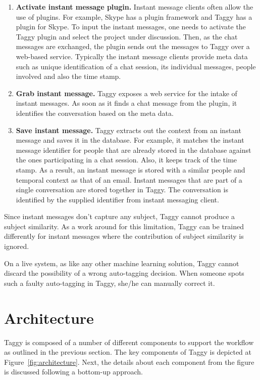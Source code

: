 \begin{enumerate}
	\item \textbf{Activate instant message plugin.} Instant message clients often allow the use of plugins. For example, Skype \cite{skype} has a plugin framework and Taggy has a plugin for Skype. To input the instant messages, one needs to activate the Taggy plugin and select the project under discussion. Then, as the chat messages are exchanged, the plugin sends out the messages to Taggy over a web-based service. Typically the instant message clients provide meta data such as unique identification of a chat session, its individual messages, people involved and also the time stamp.

	\item \textbf{Grab instant message.} Taggy exposes a web service for the intake of instant messages. As soon as it finds a chat message from the plugin, it identifies the conversation based on the meta data.
	
	\item \textbf{Save instant message.} Taggy extracts out the context from an instant message and saves it in the database. For example, it matches the instant message identifier for people that are already stored in the database against the ones participating in a chat session. Also, it keeps track of the time stamp. As a result, an instant message is stored with a similar people and temporal context as that of an email. Instant messages that are part of a single conversation are stored together in Taggy. The conversation is identified by the supplied identifier from instant messaging client.
\end{enumerate}

Since instant messages don't capture any subject, Taggy cannot produce a subject similarity. As a work around for this limitation, Taggy can be trained differently for instant messages where the contribution of subject similarity is ignored.

On a live system, as like any other machine learning solution, Taggy cannot discard the possibility of a wrong auto-tagging decision. When someone spots such a faulty auto-tagging in Taggy, she/he can manually correct it.

\section{Architecture}
Taggy is composed of a number of different components to support the workflow as outlined in the previous section. The key components of Taggy is depicted at Figure~\ref{fig:architecture}. Next, the details about each component from the figure is discussed following a bottom-up approach.

